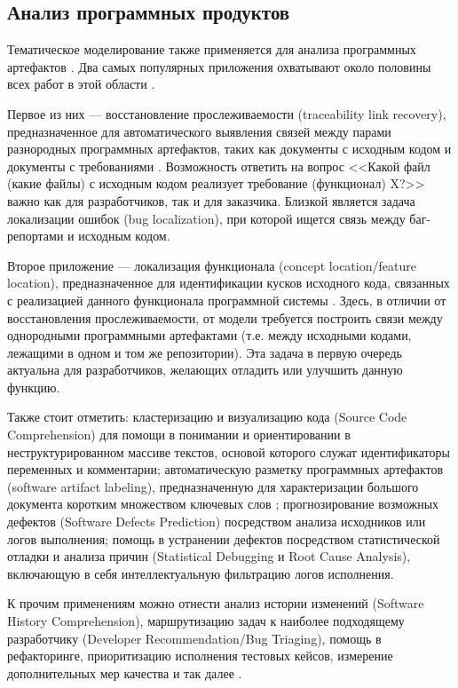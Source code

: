 \subsection{Анализ программных продуктов}

Тематическое моделирование также применяется для анализа программных артефактов \cite{sun2016exploring,chen2016survey}. Два самых популярных приложения охватывают около половины всех работ в этой области \cite{chen2016survey}. 

Первое из них --- восстановление прослеживаемости (traceability link recovery), предназначенное для автоматического выявления связей между парами разнородных программных артефактов, таких как документы с исходным кодом и документы с требованиями \cite{asuncion2010software}. Возможность ответить на вопрос <<Какой файл (какие файлы) с исходным кодом реализует требование (функционал) X?>> важно как для разработчиков, так и для заказчика. Близкой является задача локализации ошибок (bug localization), при которой ищется связь между баг-репортами и исходным кодом.

Второе приложение --- локализация функционала (concept location/feature location), предназначенное для идентификации кусков исходного кода, связанных с реализацией данного функционала программной системы \cite{dit2013feature}. Здесь, в отличии от восстановления прослеживаемости, от модели требуется построить связи между однородными программными артефактами (т.е. между исходными кодами, лежащими в одном и том же репозитории). Эта задача в первую очередь актуальна для разработчиков, желающих отладить или улучшить данную функцию.

Также стоит отметить: кластеризацию и визуализацию кода  (Source Code Comprehension) для помощи в понимании и ориентировании в неструктурированном массиве текстов, основой которого служат идентификаторы переменных и комментарии; автоматическую разметку программных артефактов (software artifact labeling), предназначенную для характеризации большого документа коротким множеством ключевых слов \cite{de2012using}; прогнозирование возможных дефектов (Software Defects Prediction) посредством анализа исходников или логов выполнения; помощь в  устранении дефектов посредством статистической отладки и анализа причин (Statistical Debugging и Root Cause Analysis), включающую в себя интеллектуальную фильтрацию логов исполнения.

К прочим применениям можно отнести анализ истории изменений (Software History Comprehension), маршрутизацию задач к наиболее подходящему разработчику (Developer Recommendation/Bug Triaging), помощь в рефакторинге, приоритизацию исполнения тестовых кейсов, измерение дополнительных мер качества и так далее \cite{sun2016exploring,chen2016survey}.

